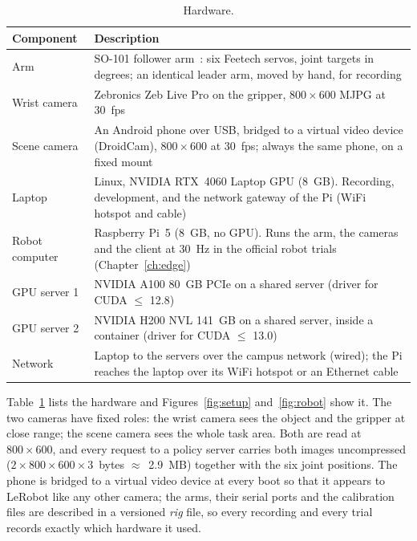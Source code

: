 \begin{table}[htbp]
  \centering
  \small
  \begin{tabularx}{\textwidth}{l X}
    \toprule
    Component & Description \\
    \midrule
    Arm & SO-101 follower arm~\cite{so101}: six Feetech servos, joint targets in degrees; an identical leader arm,
          moved by hand, for recording \\
    Wrist camera & Zebronics Zeb Live Pro on the gripper, $800\times600$ MJPG at 30~fps \\
    Scene camera & An Android phone over USB, bridged to a virtual video device (DroidCam), $800\times600$ at 30~fps;
                   always the same phone, on a fixed mount \\
    Laptop & Linux, NVIDIA RTX~4060 Laptop GPU (8~GB). Recording, development, and the network gateway of the Pi
                     (WiFi hotspot and cable) \\
    Robot computer & Raspberry Pi~5 (8~GB, no GPU). Runs the arm, the cameras and the client at 30~Hz in the official
                     robot trials (Chapter~\ref{ch:edge}) \\
    GPU server 1 & NVIDIA A100 80~GB PCIe on a shared server (driver for CUDA $\le$ 12.8) \\
    GPU server 2 & NVIDIA H200 NVL 141~GB on a shared server, inside a container (driver for CUDA $\le$ 13.0) \\
    Network & Laptop to the servers over the campus network (wired); the Pi reaches the laptop over its WiFi hotspot
                     or an Ethernet cable \\
    \bottomrule
  \end{tabularx}
  \caption{Hardware.}\label{tab:hardware}
\end{table}

Table~\ref{tab:hardware} lists the hardware and Figures~\ref{fig:setup} and~\ref{fig:robot} show it. The two cameras
have fixed roles: the wrist camera sees the object and the gripper at close range; the scene camera sees the whole
task area. Both are read at $800\times600$, and every request to a policy server carries both images uncompressed
($2\times800\times600\times3$~bytes $\approx$~2.9~MB) together with the six joint positions. The phone is bridged
to a virtual video device at every boot so that it appears to LeRobot like any other camera; the arms, their serial
ports and the calibration files are described in a versioned \emph{rig} file, so every recording and every trial
records exactly which hardware it used.

